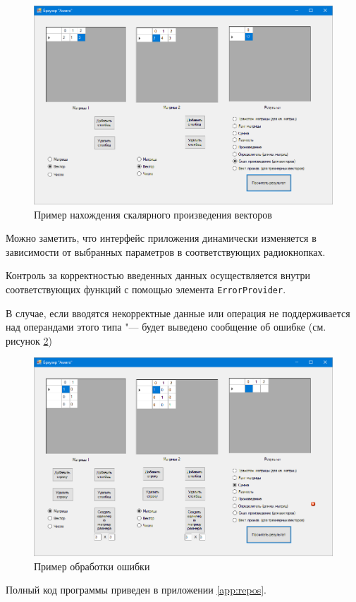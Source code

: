 \begin{figure}[H]
    \centering
    \includegraphics[scale=0.4]{task6/scalar.png}
    \caption{Пример нахождения скалярного произведения векторов}
    \label{fig:scalar}
\end{figure}

Можно заметить, что интерфейс приложения динамически изменяется в 
зависимости от выбранных параметров в соответствующих радиокнопках\cite{Pan}.

Контроль за корректностью введенных данных осуществляется внутри соответствующих
функций с помощью элемента \verb|ErrorProvider|. 

В случае, если вводятся некорректные данные или операция не поддерживается
над операндами этого типа "--- будет выведено сообщение об ошибке (см. рисунок \ref{fig:error6})
\begin{figure}[H]
    \centering
    \includegraphics[scale=0.4]{task6/error1.png}
    \caption{Пример обработки ошибки}
    \label{fig:error6}
\end{figure}
Полный код программы приведен в приложении \ref{app:repos}.

